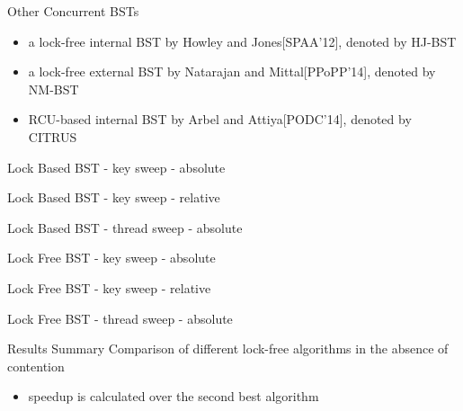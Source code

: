 \begin{frame}{Other Concurrent BSTs}
\begin{itemize}
\item a lock-free internal BST by Howley and Jones[SPAA'12], denoted by HJ-BST
\item a lock-free external BST by Natarajan and Mittal[PPoPP'14], denoted by NM-BST
\item RCU-based internal BST by Arbel and Attiya[PODC'14], denoted by CITRUS 
\end{itemize}
\end{frame}

\begin{frame}{Lock Based BST - key sweep - absolute}
%

\end{frame}

\begin{frame}{Lock Based BST - key sweep - relative}

\end{frame}

\begin{frame}{Lock Based BST - thread sweep - absolute}

\end{frame}

\begin{frame}{Lock Free BST - key sweep - absolute}
%

\end{frame}

\begin{frame}{Lock Free BST - key sweep - relative}

\end{frame}

\begin{frame}{Lock Free BST - thread sweep - absolute}

\end{frame}

\begin{frame}{Results Summary}
Comparison of different lock-free algorithms in the absence of contention

\pause
\begin{itemize}
\item speedup is calculated over the second best algorithm
\end{itemize}

\end{frame}
